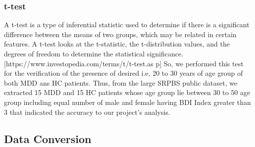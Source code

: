\documentclass{article}
\begin{document}
\subsubsection{t-test}

A t-test is a type of inferential statistic used to determine if there
is a significant difference between the means of two groups, which may
be related in certain features. A t-test looks at the t-statistic, the
t-distribution values, and the degrees of freedom to determine the
statistical significance.
[https://www.investopedia.com/terms/t/t-test.as p] So, we performed
this test for the verification of the presence of desired i.e, 20 to
30 years of age group of both MDD ans HC patients. Thus, from the
large SRPBS public dataset, we extracted 15 MDD and 15 HC patients
whose age group lie between 30 to 50 age group including equal number
of male and female having BDI Index greater than 3 that indicated the
accuracy to our project's analysis.

\subsection{Data Conversion}
\end{document}
